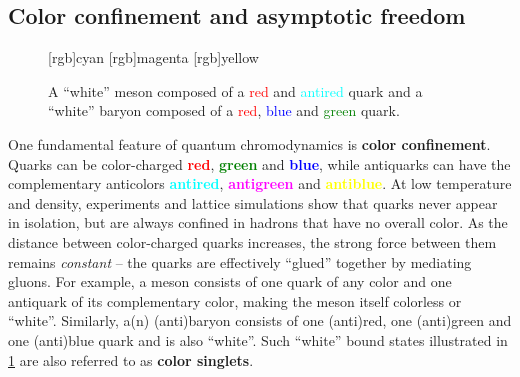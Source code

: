 \subsection*{Color confinement and asymptotic freedom}

\begin{figure}[t]
\centering
{}
[rgb]{cyan}
[rgb]{magenta}
[rgb]{yellow}
\caption{\label{fig:qcd:colorless_hadrons}%
	A ``white'' meson composed of a \textcolor{red}{red} and \textcolor{cyan}{antired} quark and
	a ``white'' baryon composed of a \textcolor{red}{red}, \textcolor{blue}{blue} and \textcolor{green}{green} quark.
}
\end{figure}

One fundamental feature of quantum chromodynamics is \textbf{color confinement}.
Quarks can be color-charged \textcolor{red}{\textbf{red}}, \textcolor{green}{\textbf{green}} and \textcolor{blue}{\textbf{blue}},
while antiquarks can have the complementary anticolors \textcolor{cyan}{\textbf{antired}}, \textcolor{magenta}{\textbf{antigreen}} and \textcolor{yellow}{\textbf{antiblue}}.
At low temperature and density, experiments and lattice simulations show that quarks never appear in isolation, but are always confined in hadrons that have no overall color.
As the distance between color-charged quarks increases, the strong force between them remains \emph{constant} -- the quarks are  effectively ``glued'' together by mediating gluons.
For example, a meson consists of one quark of any color and one antiquark of its complementary color, making the meson itself colorless or ``white''.
Similarly, a(n) (anti)baryon consists of one (anti)red, one (anti)green and one (anti)blue quark and is also ``white''.
Such ``white'' bound states illustrated in \cref{fig:qcd:colorless_hadrons} are also referred to as \textbf{color singlets}.

